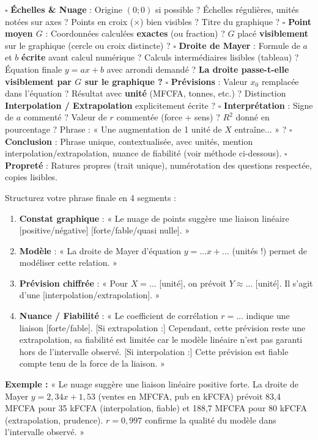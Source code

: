 \documentclass[11pt]{article}
\begin{document}
\begin{aretenir}
$\square$ \textbf{Échelles \& Nuage} : Origine $(0;0)$ si possible ? Échelles régulières, unités notées sur axes ? Points en croix ($\times$) bien visibles ? Titre du graphique ?
$\square$ \textbf{Point moyen $G$} : Coordonnées calculées \textbf{exactes} (ou fraction) ? $G$ placé \textbf{visiblement} sur le graphique (cercle ou croix distincte) ?
$\square$ \textbf{Droite de Mayer} : Formule de $a$ et $b$ \textbf{écrite} avant calcul numérique ? Calculs intermédiaires lisibles (tableau) ? Équation finale $y = ax + b$ avec arrondi demandé ? \textbf{La droite passe-t-elle visiblement par $G$ sur le graphique ?}
$\square$ \textbf{Prévisions} : Valeur $x_0$ remplacée dans l'équation ? Résultat avec \textbf{unité} (MFCFA, tonnes, etc.) ? Distinction \textbf{Interpolation / Extrapolation} explicitement écrite ?
$\square$ \textbf{Interprétation} : Signe de $a$ commenté ? Valeur de $r$ commentée (force + sens) ? $R^2$ donné en pourcentage ? Phrase : « Une augmentation de 1 unité de $X$ entraîne... » ?
$\square$ \textbf{Conclusion} : Phrase unique, contextualisée, avec unités, mention interpolation/extrapolation, nuance de fiabilité (voir méthode ci-dessous).
$\square$ \textbf{Propreté} : Ratures propres (trait unique), numérotation des questions respectée, copies lisibles.
\end{aretenir}

\begin{methode}
Structurez votre phrase finale en 4 segments :
\begin{enumerate}
    \item \textbf{Constat graphique} : « Le nuage de points suggère une liaison linéaire [positive/négative] [forte/fable/quasi nulle]. »
    \item \textbf{Modèle} : « La droite de Mayer d'équation $y = \dots x + \dots$ (unités !) permet de modéliser cette relation. »
    \item \textbf{Prévision chiffrée} : « Pour $X = \dots$ [unité], on prévoit $Y \approx \dots$ [unité]. Il s'agit d'une [interpolation/extrapolation]. »
    \item \textbf{Nuance / Fiabilité} : « Le coefficient de corrélation $r = \dots$ indique une liaison [forte/fable]. [Si extrapolation :] Cependant, cette prévision reste une extrapolation, sa fiabilité est limitée car le modèle linéaire n'est pas garanti hors de l'intervalle observé. [Si interpolation :] Cette prévision est fiable compte tenu de la force de la liaison. »
\end{enumerate}
\textbf{Exemple :} « Le nuage suggère une liaison linéaire positive forte. La droite de Mayer $y = 2,34x + 1,53$ (ventes en MFCFA, pub en kFCFA) prévoit 83,4 MFCFA pour 35 kFCFA (interpolation, fiable) et 188,7 MFCFA pour 80 kFCFA (extrapolation, prudence). $r=0,997$ confirme la qualité du modèle dans l'intervalle observé. »
\end{methode}
\end{document}
